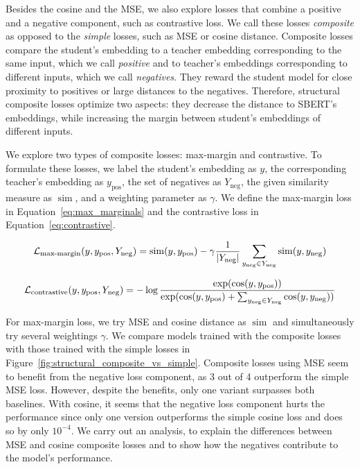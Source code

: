 Besides the cosine and the MSE, we also explore losses that combine a positive
and a negative component, such as contrastive loss. We call these losses
\emph{composite} as opposed to the \emph{simple} losses, such as MSE or cosine
distance. Composite losses compare the student's embedding to a teacher
embedding corresponding to the same input, which we call \emph{positive} and to
teacher's embeddings corresponding to different inputs, which we call
\emph{negatives}. They reward the student model for close proximity to
positives or large distances to the negatives. Therefore, structural composite
losses optimize two aspects: they decrease the distance to SBERT's embeddings,
while increasing the margin between student's embeddings of different inputs.

We explore two types of composite losses: max-margin and contrastive. To
formulate these losses, we label the student's embedding as $y$, the
corresponding teacher's embedding as $y_{\text{pos}}$, the set of negatives as
$Y_{\text{neg}}$, the given similarity measure as $\operatorname{sim}$, and a
weighting parameter as $\gamma$. We define the max-margin loss in
Equation~\ref{eq:max_marginals} and the contrastive loss in
Equation~\ref{eq:contrastive}.

\begin{equation}
  \mathcal{L}_{\text{max-margin}}(y, y_\text{pos}, Y_\text{neg}) =
    \operatorname{sim}(y, y_\text{pos}) -
    \gamma \frac{1}{|Y_\text{neg}|} \sum_{y_\text{neg} \in Y_\text{neg}}
      \operatorname{sim}(y, y_\text{neg})
  \label{eq:max_marginals}
\end{equation}

\begin{equation}
  \mathcal{L}_{\text{contrastive}}(y, y_\text{pos}, Y_\text{neg}) =
    -\log \frac{
      \exp(\cos(y, y_\text{pos}))
    }{
      \exp(
        \cos(y, y_\text{pos}) +
        \sum_{y_\text{neg} \in Y_\text{neg}} \cos(y, y_\text{neg})
      )
    }
  \label{eq:contrastive}
\end{equation}

For max-margin loss, we try MSE and cosine distance as $\operatorname{sim}$ and
simultaneously try several weightings $\gamma$. We compare models trained with
the composite losses with those trained with the simple losses in
Figure~\ref{fig:structural_composite_vs_simple}. Composite losses using MSE
seem to benefit from the negative loss component, as 3 out of 4 outperform the
simple MSE loss. However, despite the benefits, only one variant surpasses both
baselines. With cosine, it seems that the negative loss component hurts the
performance since only one version outperforms the simple cosine loss and does
so by only $10^{-4}$. We carry out an analysis, to explain the differences
between MSE and cosine composite losses and to show how the negatives
contribute to the model's performance.

